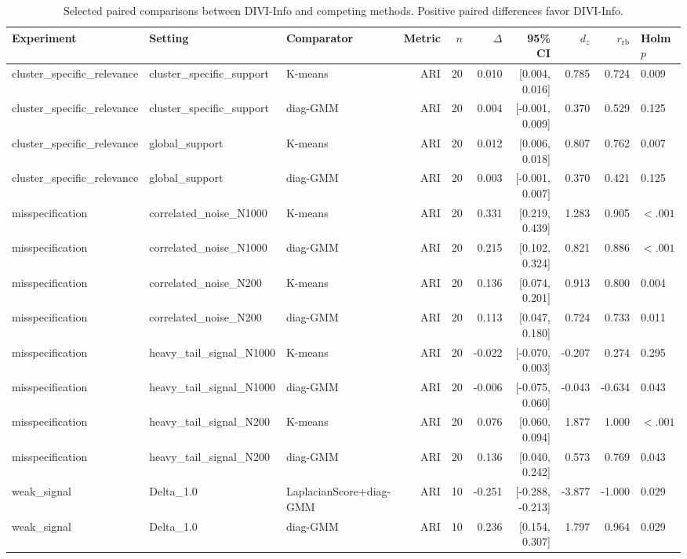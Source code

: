 \begin{table}[t]
\centering
\footnotesize
\caption{Selected paired comparisons between DIVI-Info and competing methods. Positive paired differences favor DIVI-Info.}
\label{tab:paired_tests_main}
\begin{tabular}{lllrrrrrr}
\toprule
Experiment & Setting & Comparator & Metric & $n$ & $\Delta$ & 95\% CI & $d_z$ & $r_{\mathrm{rb}}$ & Holm $p$ \\
\midrule
cluster\_specific\_relevance & cluster\_specific\_support & K-means & ARI & 20 & 0.010 & [0.004, 0.016] & 0.785 & 0.724 & 0.009 \\
cluster\_specific\_relevance & cluster\_specific\_support & diag-GMM & ARI & 20 & 0.004 & [-0.001, 0.009] & 0.370 & 0.529 & 0.125 \\
cluster\_specific\_relevance & global\_support & K-means & ARI & 20 & 0.012 & [0.006, 0.018] & 0.807 & 0.762 & 0.007 \\
cluster\_specific\_relevance & global\_support & diag-GMM & ARI & 20 & 0.003 & [-0.001, 0.007] & 0.370 & 0.421 & 0.125 \\
misspecification & correlated\_noise\_N1000 & K-means & ARI & 20 & 0.331 & [0.219, 0.439] & 1.283 & 0.905 & $<.001$ \\
misspecification & correlated\_noise\_N1000 & diag-GMM & ARI & 20 & 0.215 & [0.102, 0.324] & 0.821 & 0.886 & $<.001$ \\
misspecification & correlated\_noise\_N200 & K-means & ARI & 20 & 0.136 & [0.074, 0.201] & 0.913 & 0.800 & 0.004 \\
misspecification & correlated\_noise\_N200 & diag-GMM & ARI & 20 & 0.113 & [0.047, 0.180] & 0.724 & 0.733 & 0.011 \\
misspecification & heavy\_tail\_signal\_N1000 & K-means & ARI & 20 & -0.022 & [-0.070, 0.003] & -0.207 & 0.274 & 0.295 \\
misspecification & heavy\_tail\_signal\_N1000 & diag-GMM & ARI & 20 & -0.006 & [-0.075, 0.060] & -0.043 & -0.634 & 0.043 \\
misspecification & heavy\_tail\_signal\_N200 & K-means & ARI & 20 & 0.076 & [0.060, 0.094] & 1.877 & 1.000 & $<.001$ \\
misspecification & heavy\_tail\_signal\_N200 & diag-GMM & ARI & 20 & 0.136 & [0.040, 0.242] & 0.573 & 0.769 & 0.043 \\
weak\_signal & Delta\_1.0 & LaplacianScore+diag-GMM & ARI & 10 & -0.251 & [-0.288, -0.213] & -3.877 & -1.000 & 0.029 \\
weak\_signal & Delta\_1.0 & diag-GMM & ARI & 10 & 0.236 & [0.154, 0.307] & 1.797 & 0.964 & 0.029 \\

\end{tabular}
\end{table}
